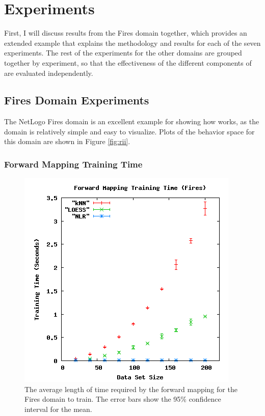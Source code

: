 \section{Experiments}\label{sec:exps}

First, I will discuss results from the Fires domain together, which provides an extended example that explains the methodology and results for each of the seven experiments.
The rest of the experiments  for the other domains are grouped together by experiment, so that the effectiveness of the different components of \fw are evaluated independently.

 \subsection{Fires Domain Experiments}

The NetLogo Fires domain is an excellent example for showing how \fw works, as the domain is relatively simple and easy to visualize.
Plots of the behavior space for this domain are shown in Figure \ref{fig:rii}.




\subsubsection{Forward Mapping Training Time}


\begin{figure}[ht]
\centering
\includegraphics[scale=.5]{images/results_fires/fmtraining.png}
\caption{The average length of time required by the forward mapping for the Fires domain to train.
The error bars show the 95\% confidence interval for the mean.}
\label{fig:firefmtraining}
\end{figure}

